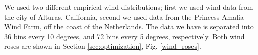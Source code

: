 We used two different empirical wind distributions; first we used wind data from the city of Alturas, California, second we used data from the Princess Amalia Wind Farm, off the coast of the Netherlands. 
The data we have is separated into 36 bins every 10 degrees, and 72 bins every 5 degrees, respectively. Both wind roses are shown in Section \ref{sec:optimization}, Fig. \ref{wind_roses}.



